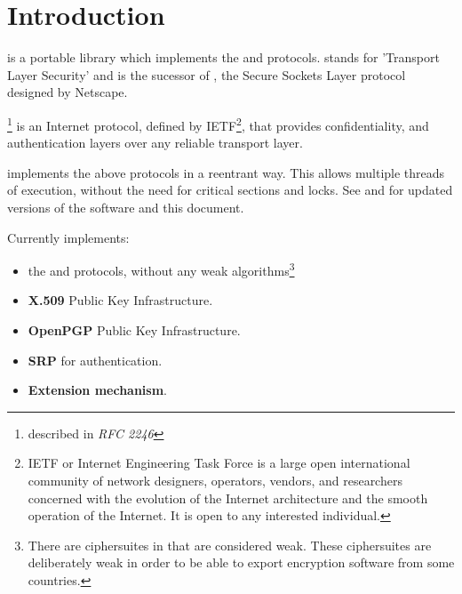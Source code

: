 \section{Introduction}
\par
\gnutls{} is a portable library which implements the \tlsI{} and 
\sslIII{} protocols.
\tls{} stands for 'Transport Layer Security' and is the sucessor of \ssl{}, 
the Secure Sockets Layer protocol designed by Netscape. 

\tlsI{}\footnote{described in {\it RFC 2246}} is an Internet protocol,
defined by {IETF}\footnote{IETF or Internet Engineering Task Force 
is a large open international community of network
designers, operators, vendors, and researchers concerned with the evolution of 
the Internet architecture and the smooth operation of the Internet. It is open to any interested individual.}, 
that provides confidentiality, and authentication layers over any reliable
transport layer.

\par
\gnutls{} implements the above
protocols in a reentrant way. This allows multiple threads of
execution, without the need for critical sections and locks. See
and  
for updated versions of the \gnutls{} software and this document.

\par
Currently \gnutls{} implements:
\begin{itemize}
 \item the \tlsI{} and \sslIII{} protocols, without any weak algorithms\footnote{
There are ciphersuites in \tlsI{} that are considered weak. These
ciphersuites are deliberately weak in order to be able to export encryption
software from some countries.}
 \item {\bf X.509} Public Key Infrastructure.
 \item {\bf OpenPGP} Public Key Infrastructure.
 \item {\bf SRP} for \tls{} authentication.
 \item \tls{} {\bf Extension mechanism}.
\end{itemize}
